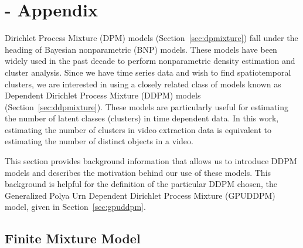 \documentclass[twocolumn, final]{svjour3}
\begin{document}

\appendix

\section{-  Appendix}
\label{sec:modelbackground}

Dirichlet Process Mixture (DPM) models (Section~\ref{sec:dpmixture}) fall under the heading of Bayesian nonparametric (BNP) models. These models have been widely used in the past decade to perform nonparametric density estimation and cluster analysis. Since we have time series data and wish to find spatiotemporal clusters, we are interested in using a closely related class of models known as Dependent Dirichlet Process Mixture (DDPM) models (Section~\ref{sec:ddpmixture}). These models are particularly useful for estimating the number of latent classes (clusters) in time dependent data. In this work, estimating the number of clusters in video extraction data is equivalent to estimating the number of distinct objects in a video.

This section provides background information that allows us to introduce DDPM models and describes the motivation behind our use of these models. This background is helpful for the definition of the particular DDPM chosen, the Generalized Polya Urn Dependent Dirichlet Process Mixture (GPUDDPM) model, given in Section~\ref{sec:gpuddpm}.


\subsection{Finite Mixture Model}
\label{sec:finitemixture}
\end{document}
